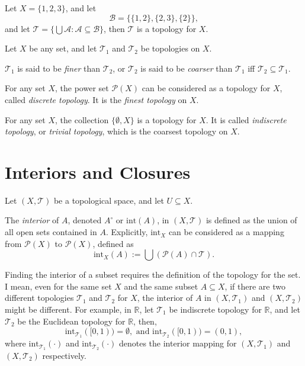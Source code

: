 \documentclass{report}
\begin{document}
\begin{example}
	Let $X = \{1, 2, 3\}$, and let
	$$
	\mathcal B = \{\{1,2\}, \{2, 3\}, \{2\}\},
	$$
	and let $\mathcal T = \{\bigcup \mathcal A: \mathcal A \subseteq \mathcal B\}$, then $\mathcal T$ is a topology for $X$.
\end{example}


\begin{definition}
	Let $X$ be any set, and let $\mathcal T_1$ and $\mathcal T_2$ be topologies on $X$.
	
	$\mathcal T_1$ is said to be \textit{finer} than $\mathcal T_2$, or $\mathcal T_2$ is said to be \textit{coarser} than $\mathcal T_1$ iff $\mathcal T_2 \subseteq \mathcal T_1$.
\end{definition}


\begin{example}
	For any set $X$, the power set $\mathcal P(X)$ can be considered as a topology for $X$, called \textit{discrete topology}. It is the \textit{finest topology} on $X$.
\end{example}

\begin{example}
	For any set $X$, the collection $\{\emptyset, X\}$ is a topology for $X$. It is called \textit{indiscrete topology}, or \textit{trivial topology}, which is the coarsest topology on $X$.
\end{example}


\section{Interiors and Closures}


\begin{definition}
	Let $(X, \mathcal T)$ be a topological space, and let $U \subseteq X$.
	
	The \textit{interior} of $A$, denoted $A^\circ$ or $\mathrm{int} (A)$, in $(X, \mathcal T)$ is defined as the union of all open sets contained in $A$. Explicitly, $\mathrm{int}_X$ can be considered as a mapping from $\mathcal P(X)$ to $\mathcal P(X)$, defined as
	$$
	\mathrm{int}_X(A) := \bigcup (\mathcal P(A) \cap \mathcal T).
	$$
\end{definition}


\begin{note}
	Finding the interior of a subset requires the definition of the topology for the set. I mean, even for the same set $X$ and the same subset $A \subseteq X$, if there are two different topologies $\mathcal T_1$ and $\mathcal T_2$ for $X$, the interior of $A$ in $(X, \mathcal T_1)$ and $(X, \mathcal T_2)$ might be different. For example, in $\mathbb R$, let $\mathcal T_1$ be indiscrete topology for $\mathbb R$, and let $\mathcal T_2$ be the Euclidean topology for $\mathbb R$, then,
	$$
	\mathrm{int}_{\mathcal T_1} ([0,1)) = \emptyset, \text{ and } \mathrm{int}_{\mathcal T_2}([0,1)) = (0,1),
	$$
	where $\mathrm{int}_{\mathcal T_1}(\cdot)$ and $\mathrm{int}_{\mathcal T_2}(\cdot)$ denotes the interior mapping for $(X, \mathcal T_1)$ and $(X, \mathcal T_2)$ respectively.
\end{note}
\end{document}
